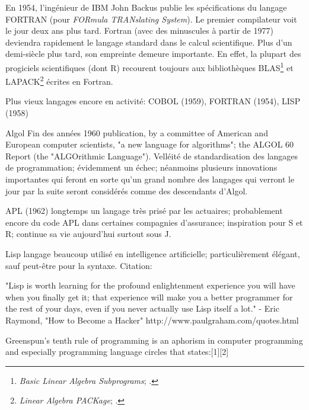 En 1954, l'ingénieur de IBM John Backus publie les spécifications du
langage FORTRAN (pour \emph{FORmula TRANslating System}). Le premier
compilateur voit le jour deux ans plus tard. Fortran (avec des
minuscules à partir de 1977) deviendra rapidement le langage standard
dans le calcul scientifique. Plus d'un demi-siècle plus tard, son
empreinte demeure importante. En effet, la plupart des progiciels
scientifiques (dont R) recourent toujours aux bibliothèques
BLAS\footnote{%
  \emph{Basic Linear Algebra Subprograms};
  .} %
et LAPACK\footnote{%
  \emph{Linear Algebra PACKage};
  .} %
écrites en Fortran.

\begin{figure}[t]
\end{figure}

Plus vieux langages encore en activité: COBOL (1959), FORTRAN (1954),
LISP (1958)


Algol Fin des années 1960 publication, by a committee of American and
European computer scientists, "a new language for algorithms"; the
ALGOL 60 Report (the "ALGOrithmic Language"). Velléité de
standardisation des langages de programmation; évidemment un échec;
néanmoins plusieurs innovations importantes qui feront en sorte qu'un
grand nombre des langages qui verront le jour par la suite seront
considérés comme des descendants d'Algol.

APL (1962) longtemps un langage très prisé par les actuaires; probablement
encore du code APL dans certaines compagnies d'assurance; inspiration
pour S et R; continue sa vie aujourd'hui surtout sous J.

Lisp langage beaucoup utilisé en intelligence artificielle;
particulièrement élégant, sauf peut-être pour la syntaxe. Citation:
\emph{}

"Lisp is worth learning for the profound enlightenment experience you will have when you finally get it; that experience will make you a better programmer for the rest of your days, even if you never actually use Lisp itself a lot."
- Eric Raymond, "How to Become a Hacker"
http://www.paulgraham.com/quotes.html

Greenspun's tenth rule of programming is an aphorism in computer programming and especially programming language circles that states:[1][2]

